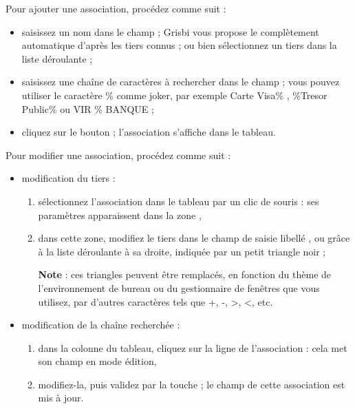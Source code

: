 Pour ajouter une association, procédez comme suit :
\begin{itemize}
	\item saisissez un nom dans le champ  ; Grisbi vous propose le complètement automatique d'après les tiers connus ; ou bien sélectionnez un tiers dans la liste déroulante ;
	\item saisissez une chaîne de caractères à rechercher dans le champ  ; vous pouvez utiliser le caractère \og \% \fg{} comme joker, par exemple \og Carte Visa\% \fg{}, \og\%Tresor Public\% \fg{} ou \og VIR \% BANQUE \fg{} ;
	\item cliquez sur le bouton  ; l'association s'affiche dans le tableau.
\end{itemize}


Pour modifier une association, procédez comme suit :
\begin{itemize}
	\item modification du tiers :
		\begin{enumerate}
			\item sélectionnez l'association dans le tableau par un clic de souris : ses paramètres apparaissent dans la zone ,
			\item dans cette zone, modifiez le tiers dans le champ de saisie libellé , ou grâce à la liste déroulante à sa droite, indiquée par un petit triangle noir ;	

			\textbf{Note} : ces triangles peuvent être remplacés, en fonction du thème de l'environnement de bureau ou du gestionnaire de fenêtres que vous utilisez, par d'autres caractères tels que +, -, >, <, etc.
		\end{enumerate}		
	\item modification de la chaîne recherchée :		
		\begin{enumerate}
			\item dans la colonne  du tableau, cliquez sur la ligne de l’association : cela met son champ  en mode édition,
			\item modifiez-la, puis validez par la touche  ; le champ  de cette association est mis à jour.	
		\end{enumerate}
\end{itemize} 
 
